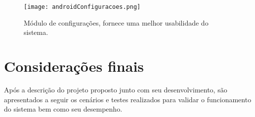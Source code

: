         \begin{figure}[!ht]
        \centering
        \texttt{[image: androidConfiguracoes.png]}
        \caption{Módulo de configurações, fornece uma melhor usabilidade do sistema.}
        \label{fig:config}
        \end{figure}
        
    
    \section{Considerações finais}
    
    Após a descrição do projeto proposto junto com seu desenvolvimento, são apresentados a seguir os cenários e testes realizados para validar o funcionamento do sistema bem como seu desempenho.